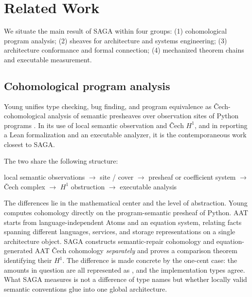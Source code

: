 \section{Related Work}\label{sec:8}

We situate the main result of SAGA within four groups:
(1) cohomological program analysis; (2) sheaves for architecture and
systems engineering; (3) architecture conformance and formal
connection; (4) mechanized theorem chains and executable measurement.

\subsection{Cohomological program analysis}\label{sec:81}

Young unifies type checking, bug finding, and program equivalence as
\v{C}ech-cohomological analysis of semantic presheaves over observation
sites of Python programs \citep{young2026sheaf}. In its use of local
semantic observation and \v{C}ech $H^1$, and in reporting a Lean
formalization and an executable analyzer, it is the contemporaneous
work closest to SAGA.

The two share the following structure:
\begin{center}
\small
local semantic observations $\to$ site / cover $\to$ presheaf or
coefficient system $\to$ \v{C}ech complex $\to$ $H^1$ obstruction
$\to$ executable analysis
\end{center}

The differences lie in the mathematical center and the level of
abstraction. Young computes cohomology directly on the
program-semantic presheaf of Python. AAT starts from
language-independent Atoms and an equation system, relating facts
spanning different languages, services, and storage representations on
a single architecture object. SAGA constructs semantic-repair
cohomology and equation-generated AAT \v{C}ech cohomology
\emph{separately} and proves a comparison theorem identifying their
$H^1$. The difference is made concrete by the one-cent case: the
amounts in question are all represented as , and the
implementation types agree. What SAGA measures is not a difference of
type names but whether locally valid semantic conventions glue into
one global architecture.


